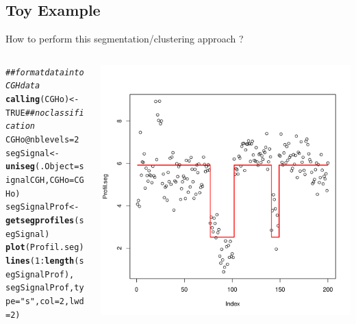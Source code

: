 \documentclass{beamer}\usepackage[]{graphicx}\usepackage[]{color}
\makeatletter
\newcommand{\hlnum}[1]{\textcolor[rgb]{0.686,0.059,0.569}{#1}}%
\newcommand{\hlstr}[1]{\textcolor[rgb]{0.192,0.494,0.8}{#1}}%
\newcommand{\hlcom}[1]{\textcolor[rgb]{0.678,0.584,0.686}{\textit{#1}}}%
\newcommand{\hlopt}[1]{\textcolor[rgb]{0,0,0}{#1}}%
\newcommand{\hlstd}[1]{\textcolor[rgb]{0.345,0.345,0.345}{#1}}%
\newcommand{\hlkwb}[1]{\textcolor[rgb]{0.69,0.353,0.396}{#1}}%
\newcommand{\hlkwc}[1]{\textcolor[rgb]{0.333,0.667,0.333}{#1}}%
\newcommand{\hlkwd}[1]{\textcolor[rgb]{0.737,0.353,0.396}{\textbf{#1}}}%
\newenvironment{kframe}{%
 \def\at@end@of@kframe{}%
 \ifinner\ifhmode%
  \def\at@end@of@kframe{\end{minipage}}%
  \begin{minipage}{\columnwidth}%
 \fi\fi%
 \def\FrameCommand##1{\hskip\@totalleftmargin \hskip-\fboxsep
 \colorbox{shadecolor}{##1}\hskip-\fboxsep
     \hskip-\linewidth \hskip-\@totalleftmargin \hskip\columnwidth}%
 \MakeFramed {\advance\hsize-\width
   \@totalleftmargin\z@ \linewidth\hsize
   \@setminipage}}%
 {\par\unskip\endMakeFramed%
 \at@end@of@kframe}
\newenvironment{knitrout}{}{} %
\makeatother
\begin{document}
\subsection*{Toy Example}
   \begin{frame}[fragile]{How to perform this segmentation/clustering approach ?}
 
\begin{columns}
\begin{column}{0.4\textwidth}
\begin{knitrout}\tiny
{}\color{fgcolor}\begin{kframe}
\begin{alltt}
\hlcom{## format data into CGHdata}
\hlkwd{calling}\hlstd{(CGHo)}\hlkwb{<-} \hlnum{TRUE} \hlcom{## no classification }
\hlstd{CGHo}\hlopt{@}\hlkwc{nblevels}\hlkwb{=}\hlnum{2}
\hlstd{segSignal}   \hlkwb{<-} \hlkwd{uniseg}\hlstd{(}\hlkwc{.Object}\hlstd{=signalCGH,}\hlkwc{CGHo}\hlstd{=CGHo)}
\hlstd{segSignalProf} \hlkwb{<-} \hlkwd{getsegprofiles}\hlstd{(segSignal)}
\hlkwd{plot}\hlstd{(Profil.seg)}
\hlkwd{lines}\hlstd{(}\hlnum{1}\hlopt{:}\hlkwd{length}\hlstd{(segSignalProf),}
      \hlstd{segSignalProf,} \hlkwc{type}\hlstd{=}\hlstr{"s"}\hlstd{,} \hlkwc{col}\hlstd{=}\hlnum{2}\hlstd{,} \hlkwc{lwd}\hlstd{=}\hlnum{2}\hlstd{)}
\end{alltt}
\end{kframe}
\end{knitrout}
\end{column}
\begin{column}{0.5\textwidth}
\includegraphics[scale=0.35]{segCode4-1.pdf}
\end{column}
\end{columns}
\end{frame}
\end{document}
